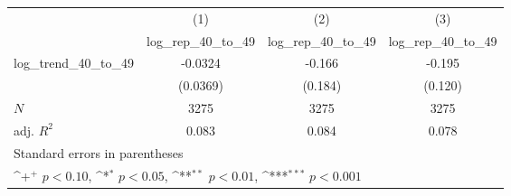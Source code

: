 {
\def\sym#1{\ifmmode^{#1}\else\(^{#1}\)\fi}
\begin{tabular}{l*{3}{c}}
\hline\hline
            &\multicolumn{1}{c}{(1)}&\multicolumn{1}{c}{(2)}&\multicolumn{1}{c}{(3)}\\
            &\multicolumn{1}{c}{log\_rep\_40\_to\_49}&\multicolumn{1}{c}{log\_rep\_40\_to\_49}&\multicolumn{1}{c}{log\_rep\_40\_to\_49}\\
\hline
log\_trend\_40\_to\_49&     -0.0324         &      -0.166         &      -0.195         \\
            &    (0.0369)         &     (0.184)         &     (0.120)         \\
\hline
\(N\)       &        3275         &        3275         &        3275         \\
adj. \(R^{2}\)&       0.083         &       0.084         &       0.078         \\
\hline\hline
\multicolumn{4}{l}{\footnotesize Standard errors in parentheses}\\
\multicolumn{4}{l}{\footnotesize \sym{+} \(p<0.10\), \sym{*} \(p<0.05\), \sym{**} \(p<0.01\), \sym{***} \(p<0.001\)}\\
\end{tabular}
}
